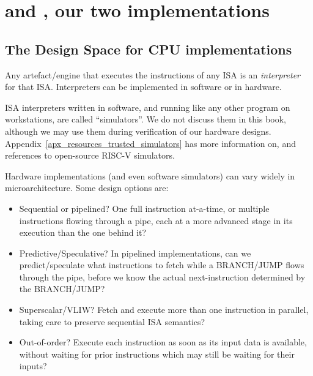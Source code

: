
\section{{\DRUM} and {\FIFE}, our two implementations}

\label{Sec_Drum_and_Fife}


\subsection{The Design Space for CPU implementations}

\label{Sec_Interpreters}

Any artefact/engine that executes the instructions of any ISA is an
\emph{interpreter} for that ISA.  Interpreters can be implemented in
software or in hardware.

ISA interpreters written in software, and running like any other
program on workstations, are called ``simulators''.  We do not discuss
them in this book, although we may use them during verification of our
hardware designs.  Appendix~\ref{apx_resources_trusted_simulators} has
more information on, and references to open-source RISC-V simulators.

Hardware implementations (and even software simulators) can vary
widely in microarchitecture.  Some design options are:

\begin{itemize}

  \item Sequential or pipelined?  One full instruction at-a-time, or
    multiple instructions flowing through a pipe, each at a more
    advanced stage in its execution than the one behind it?

  \item Predictive/Speculative? In pipelined implementations, can we
    predict/speculate what instructions to fetch while a BRANCH/JUMP
    flows through the pipe, before we know the actual next-instruction
    determined by the BRANCH/JUMP?

  \item Superscalar/VLIW? Fetch and execute more than one instruction
    in parallel, taking care to preserve sequential ISA semantics?

  \item Out-of-order? Execute each instruction as soon as its input
    data is available, without waiting for prior instructions which
    may still be waiting for their inputs?

\end{itemize}

